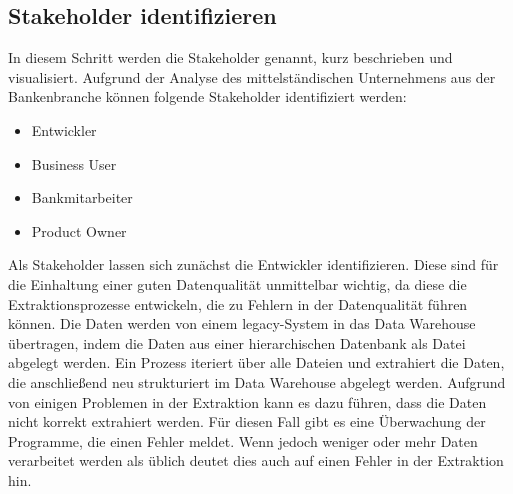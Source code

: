 
\subsection{Stakeholder identifizieren}
In diesem Schritt werden die Stakeholder genannt, kurz beschrieben und visualisiert. 
Aufgrund der Analyse des mittelständischen Unternehmens aus der Bankenbranche können folgende Stakeholder identifiziert werden:
\begin{itemize}
\itemsep-2em 
\item Entwickler            %
\item Business User         %
\item Bankmitarbeiter       %
\item Product Owner         %
\end{itemize}

Als Stakeholder lassen sich zunächst die Entwickler identifizieren.
Diese sind für die Einhaltung einer guten Datenqualität unmittelbar wichtig, da diese die Extraktionsprozesse entwickeln, die zu Fehlern in der Datenqualität führen können.
Die Daten werden von einem legacy-System in das Data Warehouse übertragen, indem die Daten aus einer hierarchischen Datenbank als Datei abgelegt werden.
Ein Prozess iteriert über alle Dateien und extrahiert die Daten, die anschließend neu strukturiert im Data Warehouse abgelegt werden.
Aufgrund von einigen Problemen in der Extraktion kann es dazu führen, dass die Daten nicht korrekt extrahiert werden.
Für diesen Fall gibt es eine Überwachung der Programme, die einen Fehler meldet.
Wenn jedoch weniger oder mehr Daten verarbeitet werden als üblich deutet dies auch auf einen Fehler in der Extraktion hin. 

